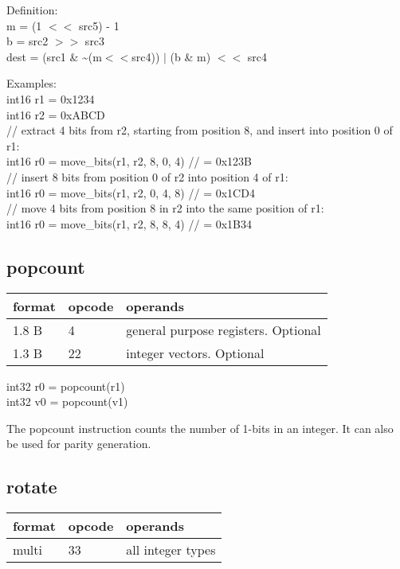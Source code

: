\documentclass[forwardcom.tex]{subfiles}
\begin{document}
Definition:\\
m = (1 $<<$ src5) - 1 \\
b = src2 $>>$ src3 \\
dest = (src1 \& \~{}(m$<<$src4)) $|$ (b \& m) $<<$ src4
\vv

Examples:\\
int16 r1 = 0x1234\\
int16 r2 = 0xABCD\\
// extract 4 bits from r2, starting from position 8, and insert into position 0 of r1:\\
int16 r0 = move\_bits(r1, r2, 8, 0, 4) // = 0x123B \\
// insert 8 bits from position 0 of r2 into position 4 of r1:\\
int16 r0 = move\_bits(r1, r2, 0, 4, 8) // = 0x1CD4 \\
// move 4 bits from position 8 in r2 into the same position of r1:\\
int16 r0 = move\_bits(r1, r2, 8, 8, 4) // = 0x1B34 \\
\vv


\subsection{popcount}
\label{table:popcountInstruction}
\begin{tabular}{|p{12mm}|p{15mm}|p{100mm}|}
\hline
\bfseries format & \bfseries opcode & \bfseries operands \\ \hline
1.8 B &  4 & general purpose registers. Optional \\ \hline
1.3 B & 22 & integer vectors. Optional \\ \hline
\end{tabular}
\vv

int32 r0 = popcount(r1) \\
int32 v0 = popcount(v1)
\vv

The popcount instruction counts the number of 1-bits in an integer. It can also be used for parity generation.
\vv


\subsection{rotate}
\label{table:rotateInstruction}
\begin{tabular}{|p{12mm}|p{15mm}|p{100mm}|}
\hline
\bfseries format & \bfseries opcode & \bfseries operands \\ \hline
multi & 33 & all integer types \\ \hline
\end{tabular}
\vv
\end{document}
